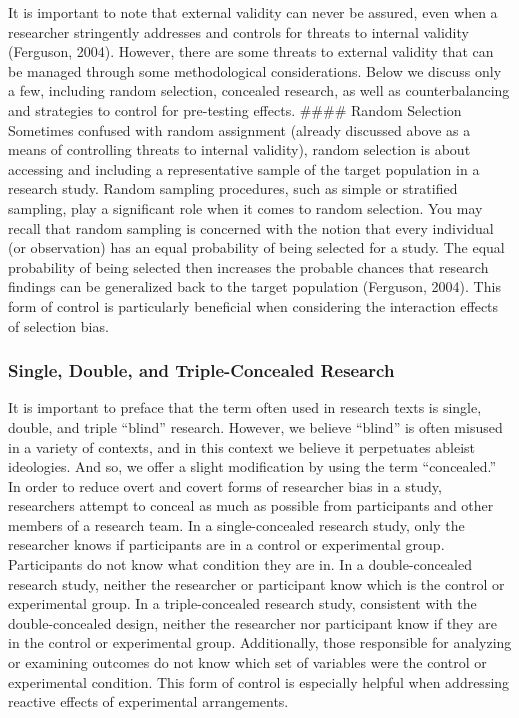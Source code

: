 \documentclass[
  11pt,
]{book}
\begin{document}
It is important to note that external validity can never be assured, even when a researcher stringently addresses and controls for threats to internal validity (Ferguson, 2004). However, there are some threats to external validity that can be managed through some methodological considerations. Below we discuss only a few, including random selection, concealed research, as well as counterbalancing and strategies to control for pre-testing effects.
\#\#\#\# Random Selection
Sometimes confused with random assignment (already discussed above as a means of controlling threats to internal validity), random selection is about accessing and including a representative sample of the target population in a research study. Random sampling procedures, such as simple or stratified sampling, play a significant role when it comes to random selection. You may recall that random sampling is concerned with the notion that every individual (or observation) has an equal probability of being selected for a study. The equal probability of being selected then increases the probable chances that research findings can be generalized back to the target population (Ferguson, 2004). This form of control is particularly beneficial when considering the interaction effects of selection bias.

\hypertarget{single-double-and-triple-concealed-research}{%
\subsubsection{Single, Double, and Triple-Concealed Research}\label{single-double-and-triple-concealed-research}}

It is important to preface that the term often used in research texts is single, double, and triple ``blind'' research. However, we believe ``blind'' is often misused in a variety of contexts, and in this context we believe it perpetuates ableist ideologies. And so, we offer a slight modification by using the term ``concealed.'' In order to reduce overt and covert forms of researcher bias in a study, researchers attempt to conceal as much as possible from participants and other members of a research team. In a single-concealed research study, only the researcher knows if participants are in a control or experimental group. Participants do not know what condition they are in. In a double-concealed research study, neither the researcher or participant know which is the control or experimental group. In a triple-concealed research study, consistent with the double-concealed design, neither the researcher nor participant know if they are in the control or experimental group. Additionally, those responsible for analyzing or examining outcomes do not know which set of variables were the control or experimental condition. This form of control is especially helpful when addressing reactive effects of experimental arrangements.
\end{document}
